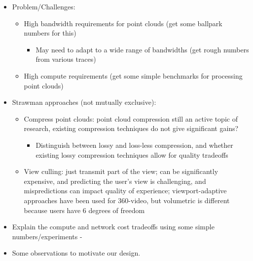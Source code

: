 \begin{itemize}
	\item Problem/Challenges:
	\begin{itemize}
		\item High bandwidth requirements for point clouds (get some ballpark numbers for this)
		\begin{itemize}
			\item May need to adapt to a wide range of bandwidths (get rough numbers from various traces)
		\end{itemize}
		
		\item High compute requirements (get some simple benchmarks for processing point clouds)
	\end{itemize}
	
	\item Strawman approaches (not mutually exclusive):
	\begin{itemize}
		\item Compress point clouds: point cloud compression still an active topic of research, existing compression techniques do not give significant gains?
		\begin{itemize}
			\item Distinguish between lossy and loss-less compression, and whether existing lossy compression techniques allow for quality tradeoffs
		\end{itemize}
		
		\item View culling: just transmit part of the view; can be significantly expensive, and predicting the user's view is challenging, and mispredictions can impact quality of experience; viewport-adaptive approaches have been used for 360-video, but volumetric is different because users have 6 degrees of freedom
	\end{itemize}
	
\end{itemize}

\begin{itemize}
	\item Explain the compute and network cost tradeoffs using some simple numbers/experiments - 
            \item Some observations to motivate our design.
\end{itemize}
